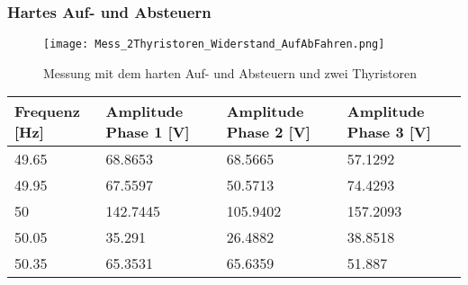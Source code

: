 \subsubsection*{Hartes Auf- und Absteuern}

\begin{figure}[ht!]
	\centering
	\texttt{[image: Mess\_2Thyristoren\_Widerstand\_AufAbFahren.png]}	
	\caption{Messung mit dem harten Auf- und Absteuern und zwei Thyristoren}\label{Mess_2Thyristoren_Widerstand_AufAbFahren}	
\end{figure}

\begin{table}[ht!]
	\centering
	\begin{tabular}{|l|l|l|l|}
		\hline
		Frequenz {[}Hz{]} & Amplitude Phase 1 {[}V{]}                                                           & Amplitude Phase 2 {[}V{]}                                                           & Amplitude Phase 3 {[}V{]}                                                           \\ \hline
		49.65             & 68.8653                                                                             & 68.5665                                                                             & 57.1292                                                                             \\ \hline
		49.95             & 67.5597                                                                             & 50.5713                                                                             & 74.4293                                                                             \\ \hline
		50                & 142.7445                                                                            & 105.9402                                                                            & 157.2093                                                                            \\ \hline
		50.05             & 35.291                                                                              & 26.4882                                                                             & 38.8518                                                                             \\ \hline
		50.35             & 65.3531                                                                             & 65.6359                                                                             & 51.887                                                                              \\ \hline

\end{tabular}
\end{table}
